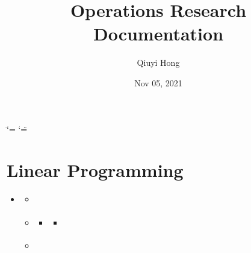 \documentclass[letterpaper,10pt,english]{sphinxmanual}
\title{Operations Research Documentation}
\date{Nov 05, 2021}
\author{Qiuyi Hong}
\begin{document}
\ifdefined\shorthandoff
  \ifnum\catcode`\=\string=\active\shorthandoff{=}\fi
  \ifnum\catcode`\"=\active{}\fi
\fi

\pagestyle{empty}
\sphinxmaketitle
\pagestyle{plain}
\sphinxtableofcontents
\pagestyle{normal}
\label{\detokenize{index::doc}}



\chapter{Linear Programming}
\label{\detokenize{operationsResearch/LP:linear-programming}}\label{\detokenize{operationsResearch/LP::doc}}
\begin{sphinxShadowBox}
\begin{itemize}
\item {} 
\sphinxAtStartPar
{}\label{\detokenize{operationsResearch/LP:id1}}{\hyperref[\detokenize{operationsResearch/LP:linear-programming}]{}}
\begin{itemize}
\item {} 
\sphinxAtStartPar
{}\label{\detokenize{operationsResearch/LP:id2}}{\hyperref[\detokenize{operationsResearch/LP:lp-model}]{}}

\item {} 
\sphinxAtStartPar
{}\label{\detokenize{operationsResearch/LP:id3}}{\hyperref[\detokenize{operationsResearch/LP:solution-methods}]{}}
\begin{itemize}
\item {} 
\sphinxAtStartPar
{}\label{\detokenize{operationsResearch/LP:id4}}{\hyperref[\detokenize{operationsResearch/LP:the-simplex-method}]{}}
\begin{itemize}
\item {} 
\sphinxAtStartPar
{}\label{\detokenize{operationsResearch/LP:id5}}{\hyperref[\detokenize{operationsResearch/LP:the-matrix-way-for-the-simplex-method}]{}}

\end{itemize}

\end{itemize}

\item {} 
\sphinxAtStartPar
{}\label{\detokenize{operationsResearch/LP:id6}}{\hyperref[\detokenize{operationsResearch/LP:applications}]{}}

\end{itemize}

\end{itemize}
\end{sphinxShadowBox}
\end{document}
